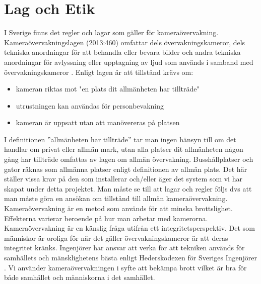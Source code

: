 
\chapter{Lag och Etik} %



\ifpdf
    \graphicspath{{7/figures/PNG/}{7/figures/PDF/}{7/figures/}}
\else
    \graphicspath{{7/figures/EPS/}{7/figures/}}
\fi



I Sverige finns det regler och lagar som gäller för kameraövervakning. Kameraövervakningslagen (2013:460) omfattar dels övervakningskameror, dels tekniska anordningar för att behandla eller bevara bilder och andra tekniska anordningar för avlyssning eller upptagning av ljud som används i samband med övervakningskameror \cite{lansstyrelsen}. 
Enligt lagen är att tillstånd krävs om:

\begin{itemize}
\item kameran riktas mot "en plats dit allmänheten har tillträde"

\item utrustningen kan användas för personbevakning

\item kameran är uppsatt utan att manövereras på platsen
\end{itemize}
I definitionen ”allmänheten har tillträde” tar man ingen hänsyn till om det handlar om privat eller allmän mark, utan alla platser dit allmänheten någon gång har tillträde omfattas av lagen om allmän övervakning. Busshållplatser och gator räknas som allmänna platser enligt definitionen av allmän plats.  Det här ställer vissa krav på den som installerar och/eller äger det system som vi har skapat under detta projektet. Man måste se till att lagar och regler följs dvs att man måste göra en ansökan om tillstånd till allmän kameraövervakning.\\
Kameraövervakning är en metod som används för att minska brottslighet. Effekterna varierar beroende på hur man arbetar med kamerorna. Kameraövervakning är en känslig fråga utifrån ett integritetsperspektiv. Det som människor är oroliga för när det gäller övervakningskameror är att deras integritet kränks. Ingenjörer har ansvar att verka för att tekniken används för samhällets och mänsklighetens bästa enligt Hederskodexen för Sveriges Ingenjörer \cite{sverige}. Vi använder kameraövervakningen i syfte att bekämpa brott vilket är bra för både samhället och människorna i det samhället.





